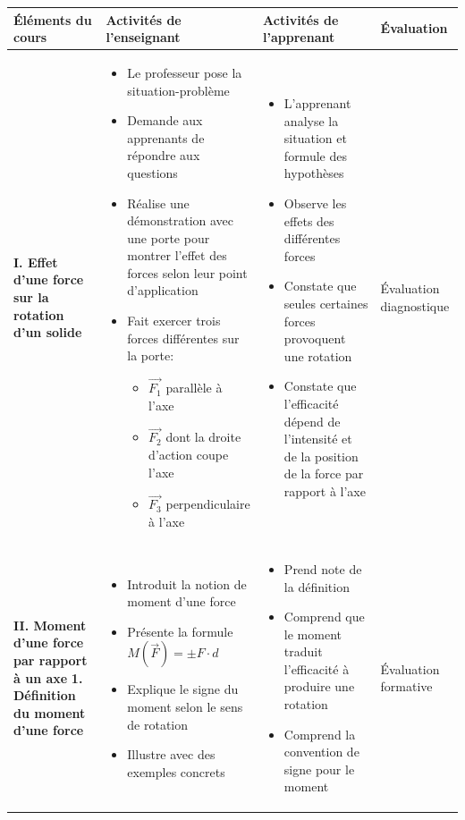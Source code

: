 \documentclass[12pt]{article}
\begin{document}
\begin{tabularx}{\textwidth}{|p{3.5cm}|X|X|p{2.5cm}|}
\hline
\rowcolor{lightgray}
\textbf{Éléments du cours} & \textbf{Activités de l'enseignant} & \textbf{Activités de l'apprenant} & \textbf{Évaluation} \\
\hline
\textbf{I. Effet d'une force sur la rotation d'un solide} & 
\begin{itemize}[leftmargin=*]
\item Le professeur pose la situation-problème
\item Demande aux apprenants de répondre aux questions
\item Réalise une démonstration avec une porte pour montrer l'effet des forces selon leur point d'application
\item Fait exercer trois forces différentes sur la porte:
  \begin{itemize}
  \item $\vec{F_1}$ parallèle à l'axe
  \item $\vec{F_2}$ dont la droite d'action coupe l'axe
  \item $\vec{F_3}$ perpendiculaire à l'axe
  \end{itemize}
\end{itemize} & 
\begin{itemize}[leftmargin=*]
\item L'apprenant analyse la situation et formule des hypothèses
\item Observe les effets des différentes forces
\item Constate que seules certaines forces provoquent une rotation
\item Constate que l'efficacité dépend de l'intensité et de la position de la force par rapport à l'axe
\end{itemize} & 
Évaluation diagnostique \\
\hline

\textbf{II. Moment d'une force par rapport à un axe} 
\textbf{1. Définition du moment d'une force} & 
\begin{itemize}[leftmargin=*]
\item Introduit la notion de moment d'une force
\item Présente la formule $M(\vec{F}) = \pm F \cdot d$
\item Explique le signe du moment selon le sens de rotation
\item Illustre avec des exemples concrets
\end{itemize} & 
\begin{itemize}[leftmargin=*]
\item Prend note de la définition
\item Comprend que le moment traduit l'efficacité à produire une rotation
\item Comprend la convention de signe pour le moment
\end{itemize} & 
Évaluation formative \\
\hline


\end{tabularx}
\end{document}

